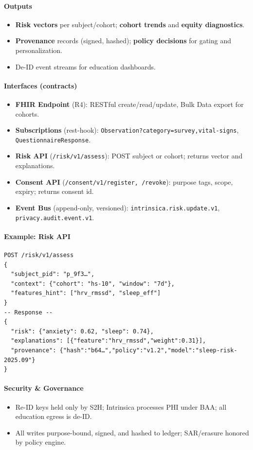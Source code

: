\documentclass[11pt]{article}
\theoremstyle{plain}
\begin{document}
\paragraph{Outputs}
\begin{itemize}
  \item \textbf{Risk vectors} per subject/cohort; \textbf{cohort trends} and \textbf{equity diagnostics}.
  \item \textbf{Provenance} records (signed, hashed); \textbf{policy decisions} for gating and personalization.
  \item De-ID event streams for education dashboards.
\end{itemize}

\paragraph{Interfaces (contracts)}
\begin{itemize}
  \item \textbf{FHIR Endpoint} (R4): RESTful create/read/update, Bulk Data export for cohorts.
  \item \textbf{Subscriptions} (rest-hook): \texttt{Observation?category=survey,vital-signs}, \texttt{QuestionnaireResponse}.
  \item \textbf{Risk API} (\texttt{/risk/v1/assess}): POST subject or cohort; returns vector and explanations.
  \item \textbf{Consent API} (\texttt{/consent/v1/register,\ /revoke}): purpose tags, scope, expiry; returns consent id.
  \item \textbf{Event Bus} (append-only, versioned): \texttt{intrinsica.risk.update.v1}, \texttt{privacy.audit.event.v1}.
\end{itemize}

\paragraph{Example: Risk API}
\begin{verbatim}
POST /risk/v1/assess
{
  "subject_pid": "p_9f3…",
  "context": {"cohort": "hs-10", "window": "7d"},
  "features_hint": ["hrv_rmssd", "sleep_eff"]
}
-- Response --
{
  "risk": {"anxiety": 0.62, "sleep": 0.74},
  "explanations": [{"feature":"hrv_rmssd","weight":0.31}],
  "provenance": {"hash":"b64…","policy":"v1.2","model":"sleep-risk-2025.09"}
}
\end{verbatim}

\paragraph{Security \& Governance}
\begin{itemize}
  \item Re-ID keys held only by S2H; Intrinsica processes PHI under BAA; all education egress is de-ID.
  \item All writes purpose-bound, signed, and hashed to ledger; SAR/erasure honored by policy engine.
\end{itemize}
\end{document}
